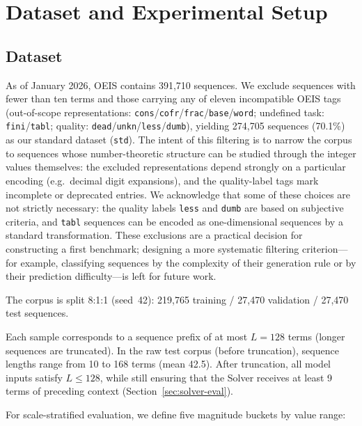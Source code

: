
\section{Dataset and Experimental Setup}
\label{sec:setup}

\subsection{Dataset}
\label{sec:dataset}

As of January 2026, OEIS contains 391,710 sequences. We exclude sequences with fewer than ten
terms and those carrying any of eleven incompatible OEIS tags (out-of-scope representations:
\texttt{cons}/\texttt{cofr}/\texttt{frac}/\texttt{base}/\texttt{word}; undefined task:
\texttt{fini}/\texttt{tabl}; quality: \texttt{dead}/\texttt{unkn}/\texttt{less}/\texttt{dumb}),
yielding 274,705 sequences (70.1\%) as our standard dataset (\texttt{std}).
The intent of this filtering is to narrow the corpus to sequences whose number-theoretic
structure can be studied through the integer values themselves: the excluded representations
depend strongly on a particular encoding (e.g.\ decimal digit expansions), and the
quality-label tags mark incomplete or deprecated entries. We acknowledge that some of these
choices are not strictly necessary: the quality labels \texttt{less} and \texttt{dumb} are
based on subjective criteria, and \texttt{tabl} sequences can be encoded as one-dimensional
sequences by a standard transformation. These exclusions are a practical decision for
constructing a first benchmark; designing a more systematic filtering criterion---for
example, classifying sequences by the complexity of their generation rule or by their
prediction difficulty---is left for future work.

The corpus is split 8:1:1 (seed~42): 219,765 training / 27,470 validation / 27,470 test sequences.

Each sample corresponds to a sequence prefix of at most $L = 128$ terms (longer sequences are
truncated). In the raw test corpus (before truncation), sequence lengths range from 10 to 168
terms (mean 42.5). After truncation, all model inputs satisfy $L \le 128$, while still ensuring
that the Solver receives at least 9 terms of preceding context (Section~\ref{sec:solver-eval}).

For scale-stratified evaluation, we define five magnitude buckets by value range:

